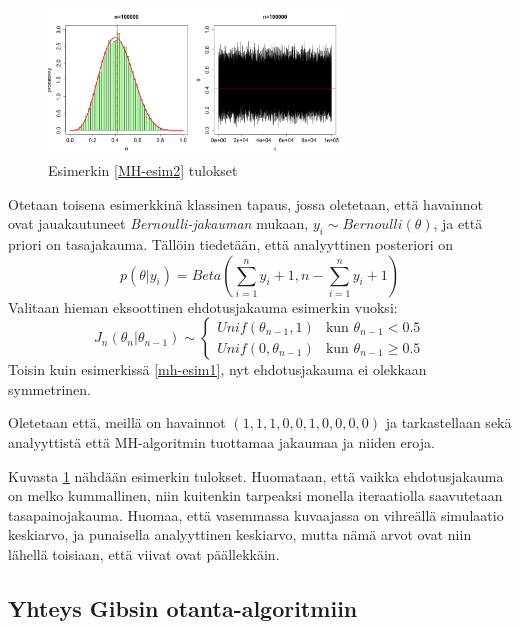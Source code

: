 \begin{esim}\label{MH-esim2}
	\begin{figure}[h!]
		\includegraphics[width=0.7\textwidth]{mhexample2}
		\caption[Yksiulotteinen Metropolis--Hastings esimerkki]{Esimerkin \ref{MH-esim2} tulokset}
		\label{kuva2}
	\end{figure}
	Otetaan toisena esimerkkinä klassinen tapaus, jossa oletetaan, että havainnot ovat jauakautuneet \textit{Bernoulli-jakauman} mukaan, 
	$y_i \sim Bernoulli(\theta)$, 
	ja että priori on tasajakauma. Tällöin tiedetään, että analyyttinen posteriori on 
	\begin{equation*}
		p(\theta|y_i) = Beta(\sum_{i=1}^{n} y_i+1, n - \sum_{i=1}^{n} y_i+1)
	\end{equation*}
	Valitaan hieman eksoottinen ehdotusjakauma esimerkin vuoksi:
	\begin{equation}
		J_n(\theta_n|\theta_{n-1}) \sim \begin{cases}
			Unif(\theta_{n-1},1) & \text{kun } \theta_{n-1}<0.5 \\
			Unif(0,\theta_{n-1}) & \text{kun } \theta_{n-1}\geq0.5
		\end{cases}
	\end{equation}
	Toisin kuin esimerkissä \ref{mh-esim1}, nyt ehdotusjakauma ei olekkaan symmetrinen.
	
	Oletetaan että, meillä on havainnot $(1,1,1,0,0,1,0,0,0,0)$ ja tarkastellaan sekä analyyttistä että MH-algoritmin tuottamaa jakaumaa ja niiden eroja.

	Kuvasta \ref{kuva2} nähdään esimerkin tulokset. Huomataan, että vaikka ehdotusjakauma on melko kummallinen, niin kuitenkin tarpeaksi monella iteraatiolla saavutetaan tasapainojakauma. Huomaa, että vasemmassa kuvaajassa on vihreällä simulaatio keskiarvo, ja punaisella analyyttinen keskiarvo, mutta nämä arvot ovat niin lähellä toisiaan, että viivat ovat päällekkäin.
\end{esim}

\subsection{Yhteys Gibsin otanta-algoritmiin}

